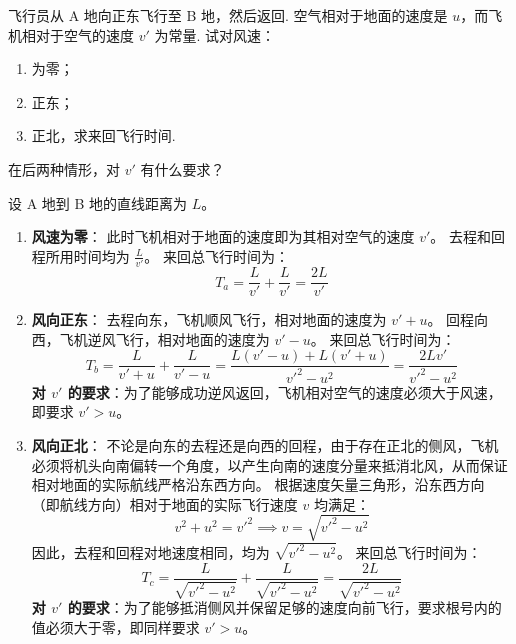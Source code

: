 \begin{exercise}\label{ex:2.14}
飞行员从 A 地向正东飞行至 B 地，然后返回. 空气相对于地面的速度是 $u$，而飞机相对于空气的速度 $v'$ 为常量. 试对风速：
\begin{enumerate}
  \item[(a)] 为零；
  \item[(b)] 正东；
  \item[(c)] 正北，求来回飞行时间.
\end{enumerate}
在后两种情形，对 $v'$ 有什么要求？
\end{exercise}
\begin{solution}
设 A 地到 B 地的直线距离为 $L$。

\begin{enumerate}
    \item[(a)] \textbf{风速为零}：
    此时飞机相对于地面的速度即为其相对空气的速度 $v'$。
    去程和回程所用时间均为 $\frac{L}{v'}$。
    来回总飞行时间为：
    $$ T_a = \frac{L}{v'} + \frac{L}{v'} = \frac{2L}{v'} $$

    \item[(b)] \textbf{风向正东}：
    去程向东，飞机顺风飞行，相对地面的速度为 $v' + u$。
    回程向西，飞机逆风飞行，相对地面的速度为 $v' - u$。
    来回总飞行时间为：
    $$ T_b = \frac{L}{v' + u} + \frac{L}{v' - u} = \frac{L(v' - u) + L(v' + u)}{v'^2 - u^2} = \frac{2L v'}{v'^2 - u^2} $$
    \textbf{对 $v'$ 的要求}：为了能够成功逆风返回，飞机相对空气的速度必须大于风速，即要求 $v' > u$。

    \item[(c)] \textbf{风向正北}：
    不论是向东的去程还是向西的回程，由于存在正北的侧风，飞机必须将机头向南偏转一个角度，以产生向南的速度分量来抵消北风，从而保证相对地面的实际航线严格沿东西方向。
    根据速度矢量三角形，沿东西方向（即航线方向）相对于地面的实际飞行速度 $v$ 均满足：
    $$ v^2 + u^2 = v'^2 \implies v = \sqrt{v'^2 - u^2} $$
    因此，去程和回程对地速度相同，均为 $\sqrt{v'^2 - u^2}$。
    来回总飞行时间为：
    $$ T_c = \frac{L}{\sqrt{v'^2 - u^2}} + \frac{L}{\sqrt{v'^2 - u^2}} = \frac{2L}{\sqrt{v'^2 - u^2}} $$
    \textbf{对 $v'$ 的要求}：为了能够抵消侧风并保留足够的速度向前飞行，要求根号内的值必须大于零，即同样要求 $v' > u$。
\end{enumerate}
\end{solution}

